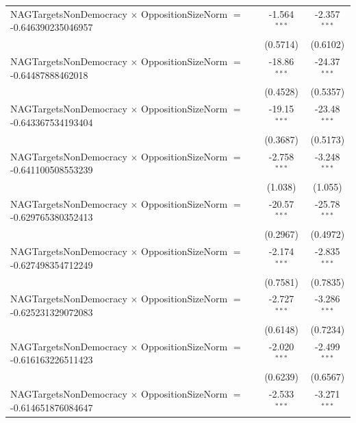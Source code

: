 \begin{tabular}{lcc}
   NAGTargetsNonDemocracy $\times$ OppositionSizeNorm $=$ -0.646390235046957    & -1.564$^{***}$       & -2.357$^{***}$\\   
                                                                                & (0.5714)             & (0.6102)\\   
   NAGTargetsNonDemocracy $\times$ OppositionSizeNorm $=$ -0.64487888462018     & -18.86$^{***}$       & -24.37$^{***}$\\   
                                                                                & (0.4528)             & (0.5357)\\   
   NAGTargetsNonDemocracy $\times$ OppositionSizeNorm $=$ -0.643367534193404    & -19.15$^{***}$       & -23.48$^{***}$\\   
                                                                                & (0.3687)             & (0.5173)\\   
   NAGTargetsNonDemocracy $\times$ OppositionSizeNorm $=$ -0.641100508553239    & -2.758$^{***}$       & -3.248$^{***}$\\   
                                                                                & (1.038)              & (1.055)\\   
   NAGTargetsNonDemocracy $\times$ OppositionSizeNorm $=$ -0.629765380352413    & -20.57$^{***}$       & -25.78$^{***}$\\   
                                                                                & (0.2967)             & (0.4972)\\   
   NAGTargetsNonDemocracy $\times$ OppositionSizeNorm $=$ -0.627498354712249    & -2.174$^{***}$       & -2.835$^{***}$\\   
                                                                                & (0.7581)             & (0.7835)\\   
   NAGTargetsNonDemocracy $\times$ OppositionSizeNorm $=$ -0.625231329072083    & -2.727$^{***}$       & -3.286$^{***}$\\   
                                                                                & (0.6148)             & (0.7234)\\   
   NAGTargetsNonDemocracy $\times$ OppositionSizeNorm $=$ -0.616163226511423    & -2.020$^{***}$       & -2.499$^{***}$\\   
                                                                                & (0.6239)             & (0.6567)\\   
   NAGTargetsNonDemocracy $\times$ OppositionSizeNorm $=$ -0.614651876084647    & -2.533$^{***}$       & -3.271$^{***}$\\   

\end{tabular}
